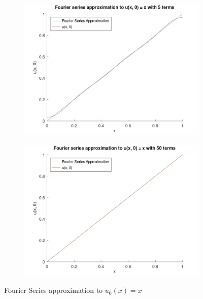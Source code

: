 \begin{solution}
    \begin{figure}[h]
        \centering
        \begin{subfigure}[b]{0.475\textwidth}
            \centering
            \includegraphics[width=\textwidth]{problem1_initial_fourier_series_solution_5_terms.png}
            \label{fig:problem1_5terms}
        \end{subfigure}
        \hfill
        \begin{subfigure}[b]{0.475\textwidth}
            \centering
            \includegraphics[width=\textwidth]{problem1_initial_fourier_series_solution_50_terms.png}
            \label{fig:problem1_50terms}
        \end{subfigure}
        \caption[Fourier Series solution]
        {\small Fourier Series approximation to $u_0(x) = x$} 
        \label{fig:fouriersoln}
    \end{figure}


\end{solution}
